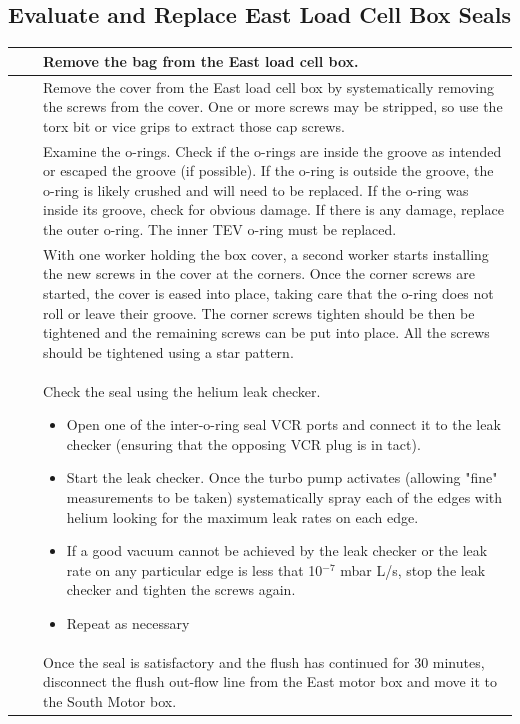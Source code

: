 \documentclass[11pt]{article}
\begin{document}
\subsection{Evaluate and Replace East Load Cell Box Seals}
\newcommand\east{\stepcounter{eastcounter}\theeastcounter}
\begin{tabular}{|c|c|p{15cm}|}
\hline\east & & Remove the bag from the East load cell box. \\
\hline\east & & Remove the cover from the East load cell box by systematically removing the screws from the cover. One or more screws may be stripped, so use the torx bit or vice grips to extract those cap screws.\\ 
\hline\east & & Examine the  o-rings. Check if the o-rings are inside the groove as intended or escaped the groove (if possible). If the o-ring is outside the groove, the o-ring is likely crushed and will need to be replaced. If the o-ring was inside its groove, check for obvious damage. If there is any damage, replace the outer o-ring. The inner TEV o-ring must be replaced. \\
\hline\east & & With one worker holding the box cover, a second worker starts installing the new screws in the cover at the corners. Once the corner screws are started, the cover is eased into place, taking care that the o-ring does not roll or leave their groove. The corner screws tighten should be then be tightened and the remaining screws can be put into place. All the screws should be tightened using a star pattern.\\
\hline\east & & Check the seal using the helium leak checker. 
\begin{itemize}
\item Open one of the inter-o-ring seal VCR ports and connect it to the leak checker (ensuring that the opposing VCR plug is in tact). 
\item Start the leak checker. Once the turbo pump activates (allowing "fine" measurements to be taken) systematically spray each of the edges with helium  looking for the maximum leak rates on each edge. 
\item If a good vacuum cannot be achieved by the leak checker or the leak rate on any particular edge is less that 10$^{-7}$ mbar L/s, stop the leak checker and tighten the screws again. 
\item Repeat as necessary
\end{itemize}
\\
\hline\east & & Once the seal is satisfactory and the flush has continued for 30 minutes, disconnect the flush out-flow line from the East motor box and move it to the South Motor box. \\

\end{tabular}
\end{document}
